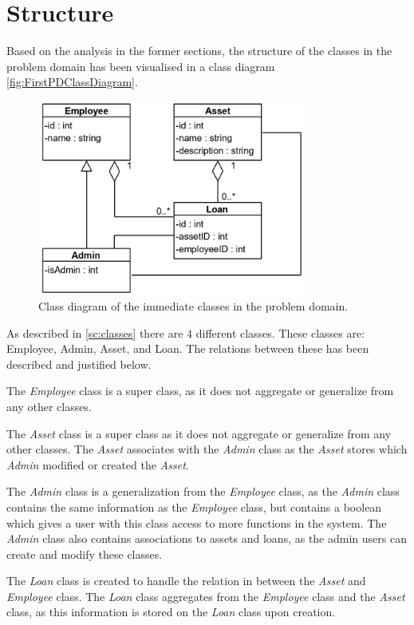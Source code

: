 \section{Structure}\label{sc:structure}
Based on the analysis in the former sections, the structure of the classes in the problem domain has been visualised in a class diagram \autoref{fig:FirstPDClassDiagram}. 

\begin{figure}[H]
    \centering
    \includegraphics[width=0.8\textwidth]{figures/PDDiagramV5.png}
    \caption{Class diagram of the immediate classes in the problem domain.}
    \label{fig:FirstPDClassDiagram}
\end{figure}

As described in \autoref{sc:classes} there are 4 different classes. These classes are: Employee, Admin, Asset, and Loan. The relations between these has been described and justified below.
\par

The \textit{Employee} class is a super class, as it does not aggregate or generalize from any other classes. 
\par

The \textit{Asset} class is a super class as it does not aggregate or generalize from any other classes. The \textit{Asset} associates with the \textit{Admin} class as the \textit{Asset} stores which \textit{Admin} modified or created the \textit{Asset}.
\par

The \textit{Admin} class is a generalization from the \textit{Employee} class, as the \textit{Admin} class contains the same information as the \textit{Employee} class, but contains a boolean which gives a user with this class access to more functions in the system. The \textit{Admin} class also contains associations to assets and loans, as the admin users can create and modify these classes.
\par

The \textit{Loan} class is created to handle the relation in between the \textit{Asset} and \textit{Employee} class. The \textit{Loan} class aggregates from the \textit{Employee} class and the \textit{Asset} class, as this information is stored on the \textit{Loan} class upon creation.
\par

